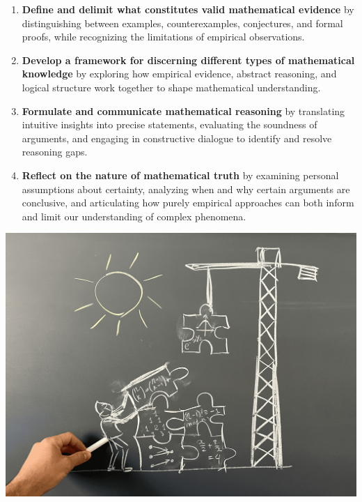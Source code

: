 \documentclass[oneside,11pt]{amsart}
\begin{document}
\begin{enumerate}
    \item \textbf{Define and delimit what constitutes valid mathematical evidence} by distinguishing between examples, counterexamples, conjectures, and formal proofs, while recognizing the limitations of empirical observations.
    \item \textbf{Develop a framework for discerning different types of mathematical knowledge} by exploring how empirical evidence, abstract reasoning, and logical structure work together to shape mathematical understanding.
    \item \textbf{Formulate and communicate mathematical reasoning} by translating intuitive insights into precise statements, evaluating the soundness of arguments, and engaging in constructive dialogue to identify and resolve reasoning gaps.
    \item \textbf{Reflect on the nature of mathematical truth} by examining personal assumptions about certainty, analyzing when and why certain arguments are conclusive, and articulating how purely empirical approaches can both inform and limit our understanding of complex phenomena.
\end{enumerate}


\begin{center}
\includegraphics[width=.5\textwidth]{EGMT_image.png}
\end{center}
\end{document}
